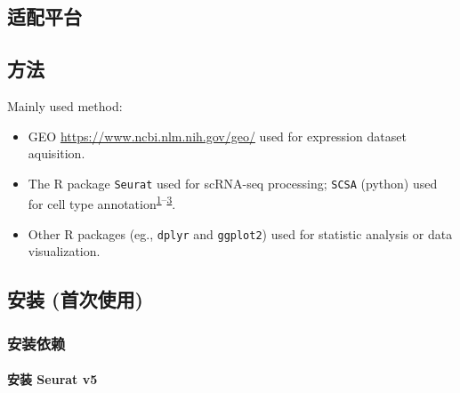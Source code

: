 \documentclass[
]{article}
\providecommand{\tightlist}{%
  \setlength{\itemsep}{0pt}\setlength{\parskip}{0pt}}
\begin{document}
\hypertarget{ux9002ux914dux5e73ux53f0}{%
\subsection{适配平台}\label{ux9002ux914dux5e73ux53f0}}

\hypertarget{ux65b9ux6cd5}{%
\subsection{方法}\label{ux65b9ux6cd5}}

Mainly used method:

\begin{itemize}
\tightlist
\item
  GEO \url{https://www.ncbi.nlm.nih.gov/geo/} used for expression dataset aquisition.
\item
  The R package \texttt{Seurat} used for scRNA-seq processing; \texttt{SCSA} (python) used for cell type annotation\textsuperscript{\protect\hyperlink{ref-IntegratedAnalHaoY2021}{1}--\protect\hyperlink{ref-ScsaACellTyCaoY2020}{3}}.
\item
  Other R packages (eg., \texttt{dplyr} and \texttt{ggplot2}) used for statistic analysis or data visualization.
\end{itemize}

\hypertarget{ux5b89ux88c5-ux9996ux6b21ux4f7fux7528}{%
\subsection{安装 (首次使用)}\label{ux5b89ux88c5-ux9996ux6b21ux4f7fux7528}}

\hypertarget{ux5b89ux88c5ux4f9dux8d56}{%
\subsubsection{安装依赖}\label{ux5b89ux88c5ux4f9dux8d56}}

\hypertarget{ux5b89ux88c5-seurat-v5}{%
\paragraph{安装 Seurat v5}\label{ux5b89ux88c5-seurat-v5}}
\end{document}
